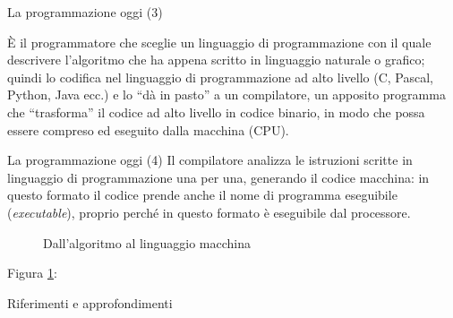 \documentclass[
    notheorems,
    11pt,
    compress,
    aspectratio=169
]{beamer}
\begin{document}
\begin{frame}{La programmazione oggi (3)}
    \begin{block}{}
        È il programmatore che sceglie un linguaggio di programmazione con il quale descrivere l’algoritmo che ha appena scritto in linguaggio naturale o grafico; quindi lo codifica nel linguaggio di programmazione ad alto livello (C, Pascal, Python, Java ecc.) e lo “dà in pasto” a un compilatore, un apposito programma che “trasforma” il codice ad alto livello in codice binario, in modo che possa essere compreso ed eseguito dalla macchina (CPU).
    \end{block}
\end{frame}

\begin{frame}{La programmazione oggi (4)}
    Il compilatore analizza le istruzioni scritte in linguaggio di programmazione una per una, generando il codice macchina: in questo formato il codice prende anche il nome di programma eseguibile (\textit{executable}), proprio perché in questo formato è eseguibile dal processore.

    \pause
    \vfill

    \begin{figure}
        \centering
    
        \caption{Dall'algoritmo al linguaggio macchina}
        \label{fig:fig31}
    \end{figure}

    {Figura \ref{fig:fig31}:} \cite[p. 326]{ISBN_8820378434}
\end{frame}


\begin{frame}{Riferimenti e approfondimenti}
    \printbibliography
\end{frame}

\end{document}

